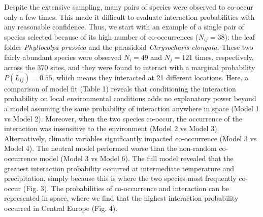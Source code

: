 \documentclass[12pt]{article}
\begin{document}
Despite the extensive sampling, many pairs of species were observed to co-occur only a few times. This made it difficult to evaluate interaction
probabilities with any reasonable confidence. Thus, we start with an
example of a single pair of species selected because of its high number of co-occurrences ($N_{ij}=38$): the leaf folder \textit{Phyllocolpa prussica} and
the parasidoid \textit{Chrysocharis elongata}. These two fairly abundant
species were observed $N_i=49$ and $N_j=121$ times, respectively, across the
370 sites, and they were found to interact with a marginal probability
$P(L_{ij})=0.55$, which means they interacted at 21 different locations. Here,
a comparison of model fit (Table 1) reveals that conditioning the interaction
probability on local environmental conditions adds no explanatory power beyond
a model assuming the same probability of interaction anywhere in space (Model 1
vs Model 2). Moreover, when the two species co-occur, the occurrence of the
interaction was insensitive to the environment (Model 2 vs Model 3).
Alternatively, climatic variables significantly impacted co-occurrence (Model
3 vs Model 4). The neutral model performed worse than the non-random co-occurrence model (Model 3 vs Model 6). The full model revealed that the
greatest interaction probability occurred at intermediate temperature and
precipitation, simply because this is where the two species most frequently
co-occur (Fig. 3). The probabilities of co-occurrence and interaction can be
represented in space, where we find that the highest interaction probability
occurred in Central Europe (Fig. 4).
\end{document}
